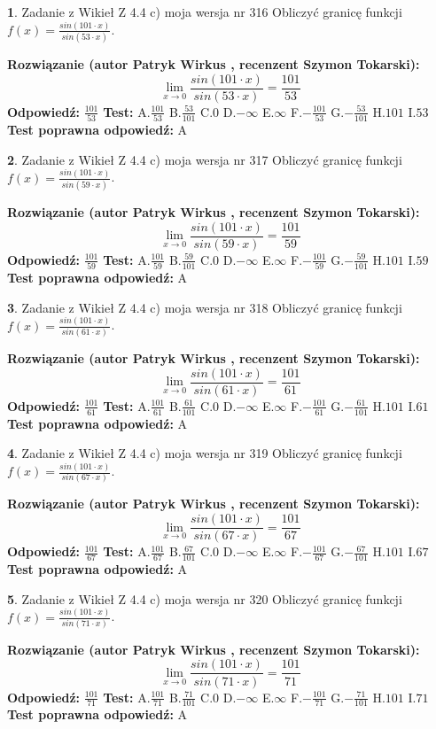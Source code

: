 \documentclass[12pt, a4paper]{article}
\theoremstyle{definition} %
\newtheorem{zad}{}
\newcommand{\zadStart}[1]{\begin{zad}#1\newline}
\newcommand{\zadStop}{\end{zad}}
\newcommand{\rozwStart}[2]{\noindent \textbf{Rozwiązanie (autor #1 , recenzent #2): }\newline}
\newcommand{\rozwStop}{\newline}
\newcommand{\odpStart}{\noindent \textbf{Odpowiedź:}\newline}
\newcommand{\odpStop}{\newline}
\newcommand{\testStart}{\noindent \textbf{Test:}\newline}
\newcommand{\testStop}{\newline}
\newcommand{\kluczStart}{\noindent \textbf{Test poprawna odpowiedź:}\newline}
\newcommand{\kluczStop}{\newline}
\begin{document}
\zadStart{Zadanie z Wikieł Z 4.4 c) moja wersja nr 316}
Obliczyć granicę funkcji $f(x)=\frac{sin(101\cdot x)}{sin(53\cdot x)}$.
\zadStop
\rozwStart{Patryk Wirkus}{Szymon Tokarski}
$$\lim\limits_{x\to 0}\frac{sin(101\cdot x)}{sin(53\cdot x)}=
\frac{101}{53}$$
\rozwStop
\odpStart
$\frac{101}{53}$
\odpStop
\testStart
A.$\frac{101}{53}$
B.$\frac{53}{101}$
C.$0$
D.$-\infty$
E.$\infty$
F.$-\frac{101}{53}$
G.$-\frac{53}{101}$
H.$101$
I.$53$
\testStop
\kluczStart
A
\kluczStop



\zadStart{Zadanie z Wikieł Z 4.4 c) moja wersja nr 317}
Obliczyć granicę funkcji $f(x)=\frac{sin(101\cdot x)}{sin(59\cdot x)}$.
\zadStop
\rozwStart{Patryk Wirkus}{Szymon Tokarski}
$$\lim\limits_{x\to 0}\frac{sin(101\cdot x)}{sin(59\cdot x)}=
\frac{101}{59}$$
\rozwStop
\odpStart
$\frac{101}{59}$
\odpStop
\testStart
A.$\frac{101}{59}$
B.$\frac{59}{101}$
C.$0$
D.$-\infty$
E.$\infty$
F.$-\frac{101}{59}$
G.$-\frac{59}{101}$
H.$101$
I.$59$
\testStop
\kluczStart
A
\kluczStop



\zadStart{Zadanie z Wikieł Z 4.4 c) moja wersja nr 318}
Obliczyć granicę funkcji $f(x)=\frac{sin(101\cdot x)}{sin(61\cdot x)}$.
\zadStop
\rozwStart{Patryk Wirkus}{Szymon Tokarski}
$$\lim\limits_{x\to 0}\frac{sin(101\cdot x)}{sin(61\cdot x)}=
\frac{101}{61}$$
\rozwStop
\odpStart
$\frac{101}{61}$
\odpStop
\testStart
A.$\frac{101}{61}$
B.$\frac{61}{101}$
C.$0$
D.$-\infty$
E.$\infty$
F.$-\frac{101}{61}$
G.$-\frac{61}{101}$
H.$101$
I.$61$
\testStop
\kluczStart
A
\kluczStop



\zadStart{Zadanie z Wikieł Z 4.4 c) moja wersja nr 319}
Obliczyć granicę funkcji $f(x)=\frac{sin(101\cdot x)}{sin(67\cdot x)}$.
\zadStop
\rozwStart{Patryk Wirkus}{Szymon Tokarski}
$$\lim\limits_{x\to 0}\frac{sin(101\cdot x)}{sin(67\cdot x)}=
\frac{101}{67}$$
\rozwStop
\odpStart
$\frac{101}{67}$
\odpStop
\testStart
A.$\frac{101}{67}$
B.$\frac{67}{101}$
C.$0$
D.$-\infty$
E.$\infty$
F.$-\frac{101}{67}$
G.$-\frac{67}{101}$
H.$101$
I.$67$
\testStop
\kluczStart
A
\kluczStop



\zadStart{Zadanie z Wikieł Z 4.4 c) moja wersja nr 320}
Obliczyć granicę funkcji $f(x)=\frac{sin(101\cdot x)}{sin(71\cdot x)}$.
\zadStop
\rozwStart{Patryk Wirkus}{Szymon Tokarski}
$$\lim\limits_{x\to 0}\frac{sin(101\cdot x)}{sin(71\cdot x)}=
\frac{101}{71}$$
\rozwStop
\odpStart
$\frac{101}{71}$
\odpStop
\testStart
A.$\frac{101}{71}$
B.$\frac{71}{101}$
C.$0$
D.$-\infty$
E.$\infty$
F.$-\frac{101}{71}$
G.$-\frac{71}{101}$
H.$101$
I.$71$
\testStop
\kluczStart
A
\kluczStop
\end{document}
